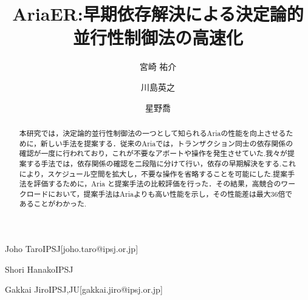\documentclass[submit,techrep,noauthor]{ipsj}
\begin{document}
\title{AriaER:早期依存解決による決定論的並行性制御法の高速化}





\author{宮崎 祐介}{Joho Taro}{IPSJ}[joho.taro@ipsj.or.jp]
\author{川島英之}{Shori Hanako}{IPSJ}
\author{星野喬}{Gakkai Jiro}{IPSJ,JU}[gakkai.jiro@ipsj.or.jp]

\begin{abstract}
本研究では，決定論的並行性制御法の一つとして知られるAriaの性能を向上させるために，新しい手法を提案する．従来のAriaでは，トランザクション同士の依存関係の確認が一度に行われており，これが不要なアボートや操作を発生させていた.我々が提案する手法では，依存関係の確認を二段階に分けて行い，依存の早期解決をする.これにより，スケジュール空間を拡大し，不要な操作を省略することを可能にした.提案手法を評価するために，Aria と提案手法の比較評価を行った．その結果，高競合のワークロードにおいて，提案手法はAriaよりも高い性能を示し，その性能差は最大36倍であることがわかった.
\end{abstract}


%
%
%

\maketitle

\end{document}
